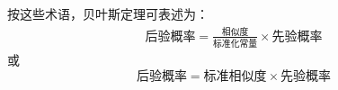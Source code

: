 \iffalse
\begin{itemize}
\item[]$P(A)$是$A$的先验概率或边缘概率。之所以称为"先验"是因为它不考虑
任何B方面的因素.
\item[]$P(A|B)$是已知$B$发生后$A$的条件概率，也由于得自$B$的取值而被称作$A$
的后验概率.
\item[]$P(B|A)$是已知$A$发生后$B$的条件概率，也由于得自$A$的取值而被称作$B$
的后验概率，也称相似度.
\item[]$P(B)$是B先验概率或边缘概率，也称标准化常量（normalizing 
constant）.
\item[]$P(B | A)/ P(B)$是标准相似度（standardised 
likelihood）.
\end{itemize}
\fi
按这些术语，贝叶斯定理可表述为：
\begin{eqnarray}
\text{后验概率}=\frac{\text{相似度}}{\text{标准化常量}}\times \text{先验概率}
\end{eqnarray}
或
 \begin{equation}
\text{后验概率}=\text{标准相似度}\times \text{先验概率}
\end{equation}
 

